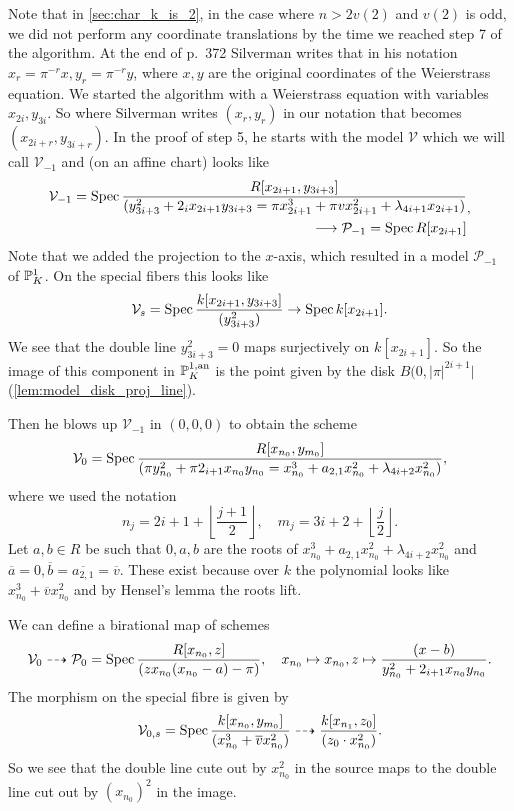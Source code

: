 Note that in \cref{sec:char_k_is_2}, in the case where $n > 2v(2)$ and $v(2)$ is odd, we did not perform any coordinate translations by the time we reached step 7 of the algorithm. 
At the end of p.\ 372 Silverman writes that in his notation $x_{r} = \pi^{-r}x, y_{r} = \pi^{-r}y$, where $x, y$ are the original coordinates of the Weierstrass equation. 
We started the algorithm with a Weierstrass equation with variables $x_{2i}, y_{3i}$. 
So where Silverman writes $(x_r, y_r)$ in our notation that becomes $(x_{2i+ r}, y_{3i + r})$. 
In the proof of step 5, he starts with the model $\mathcal{V} $ which we will call $\mathcal{V} _{-1}$ and (on an affine chart) looks like 
\[
	\begin{aligned}	
	\mathcal{V}_{-1} = \operatorname{Spec} \frac{R[x_{2i + 1}, y_{3i + 3}]}{(y_{3i + 3}^2 + 2_i x_{2i + 1}y_{3i + 3} = \pi x_{2i + 1}^3 + \pi v x_{2i + 1}^2 + \lambda_{4i + 1} x_{2i + 1})} \\ 
	\longrightarrow \mathcal{P} _{-1} = \operatorname{Spec} R[x_{2i + 1}]
	\end{aligned}
,\] 
Note that we added the projection to the $x$-axis, which resulted in a model $\mathscr P_{-1}$ of $\mathbb{P}^{1}_K$.  
On the special fibers this looks like 
\[
	\mathcal{V}_s = \operatorname{Spec} \frac{k[x_{2i + 1}, y_{3i + 3}]}{(y_{3i+3}^2)} \to \operatorname{Spec} k[x_{2i + 1}]
.\] 
We see that the double line $y_{3i + 3}^2 = 0$ maps surjectively on $k[x _{2i + 1}]$. 
So the image of this component in $\mathbb{P}^{1, \text{an}}_K$ is the point given by the disk $B(0, |\pi|^{2i + 1}|$ (\cref{lem:model_disk_proj_line}).


Then he blows up $\mathcal{V}_{-1} $ in $(0, 0, 0)$ to obtain the scheme
\[
	\mathcal{V}_0  = \operatorname{Spec} \frac{R[x_{n_0}, y_{m_0}]}{(\pi y_{n_0} ^2 + \pi2_{i + 1} x_{n_0} y_{n_0} = x_{n_0}^3 +  a_{2,1} x_{n_0}^2 + \lambda_{4i + 2} x_{n_0}^2)} 
,\] 
where we used the notation \[
	n_j = 2i + 1 + \left\lfloor \frac{j + 1}{2} \right\rfloor,\quad  m_j = 3i + 2 + \left\lfloor \frac{j }{2} \right\rfloor
.\]
Let $a, b \in R$ be such that $0, a, b$ are the roots of $x_{n_0}^3 +  a_{2,1} x_{n_0}^2 + \lambda_{4i + 2} x_{n_0}^2$ and $\overline{a} = 0, \overline{b} = \overline{a_{2,1}} = \overline{v}$.  
These exist because over $k$ the polynomial looks like $x_{n_0}^3 + \overline{v} x_{n_0}^2$ and by Hensel's lemma the roots lift. 

We can define a birational map of schemes \[
	\mathcal{V}_0 \dashrightarrow \mathcal{P} _{0} = \operatorname{Spec} \frac{R[x_{n_0}, z]}{(z x_{n_0}(x_{n_0} - a) - \pi)},\quad
	x_{n_0} \mapsto x_{n_0}, z\mapsto \frac{(x - b)}{y_{n_0}^2 + 2_{i + 1} x_{n_0}y_{n_0} }
.\] 
The morphism on the special fibre is given by \[
	\mathcal{V} _{0, s} = \operatorname{Spec} \frac{k[x_{n_0}, y_{m_0}]}{(x^3_{n_0} + \overline{v} x^2_{n_0})} \dashrightarrow \frac{k[x_{n_1}, z_0]}{(z_0 \cdot x_{n_0}^2)}
.\] 
So we see that the double line cute out by $x_{n_0}^2$ in the source maps to the double line cut out by $(x_{n_0})^2$ in the image. 

